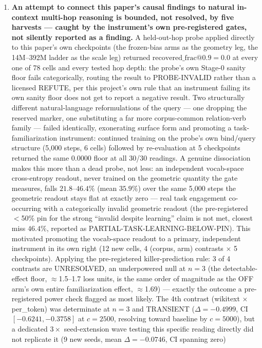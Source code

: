 \begin{enumerate}
\item \textbf{An attempt to connect this paper's causal findings to
natural in-context multi-hop reasoning is bounded, not resolved, by five
harvests --- caught by the instrument's own pre-registered gates, not
silently reported as a finding.} A held-out-hop probe applied directly to
this paper's own checkpoints (the frozen-bias arms as the geometry leg,
the 14M--392M ladder as the scale leg) returned
$\mathrm{recovered\_frac@0.9}{=}0.0$ at every one of 78 cells and every
tested hop depth: the probe's own Stage-0 sanity floor fails
categorically, routing the result to PROBE-INVALID rather than a
licensed REFUTE, per this project's own rule that an instrument failing
its own sanity floor does not get to report a negative result. Two
structurally different natural-language reformulations of the query ---
one dropping the reserved marker, one substituting a far more
corpus-common relation-verb family --- failed identically, exonerating
surface form and promoting a task-familiarization instrument: continued
training on the probe's own bind/query structure (5{,}000 steps, 6
cells) followed by re-evaluation at 5 checkpoints returned the same
$0.0000$ floor at all 30/30 readings. A genuine dissociation makes this
more than a dead probe, not less: an independent vocab-space
cross-entropy readout, never trained on the geometric quantity the gate
measures, falls $21.8$--$46.4\%$ (mean $35.9\%$) over the same
5{,}000 steps the geometric readout stays flat at exactly zero --- real
task engagement co-occurring with a categorically invalid geometric
readout (the pre-registered $<$50\% pin for the strong ``invalid despite
learning'' claim is not met, closest miss $46.4\%$, reported as
PARTIAL-TASK-LEARNING-BELOW-PIN). This motivated promoting the
vocab-space readout to a primary, independent instrument in its own
right (12 new cells, 4 (corpus, arm) contrasts $\times$ 5 checkpoints).
Applying the pre-registered killer-prediction rule: 3 of 4 contrasts are
UNRESOLVED, an underpowered null at $n{=}3$ (the detectable-effect floor,
$\approx$1.5--1.7 loss units, is the same order of magnitude as the OFF
arm's own entire familiarization effect, $\approx$1.69) --- exactly the
outcome a pre-registered power check flagged as most likely. The 4th
contrast (wikitext $\times$ per\_token) was determinate at $n{=}3$ and
TRANSIENT ($\Delta{=}{-}0.4999$, CI $[-0.6241,-0.3758]$ at $c{=}2500$,
resolving toward baseline by $c{=}5000$), but a dedicated $3\times$
seed-extension wave testing this specific reading directly did not
replicate it (9 new seeds, mean $\Delta{=}{-}0.0746$, CI spanning zero)

\end{enumerate}
